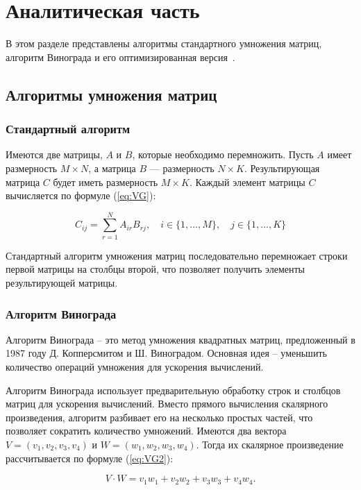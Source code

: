 \documentclass[a4paper, 12pt]{extreport}
\begin{document}
\chapter{Аналитическая часть}
В этом разделе представлены алгоритмы стандартного умножения матриц, алгоритм Винограда и его оптимизированная версия~\cite{bib1}.

\section{Алгоритмы умножения матриц}

\subsection{Стандартный алгоритм}

Имеются две матрицы, $A$ и $B$, которые необходимо перемножить. Пусть $A$ имеет размерность \( M \times N \), а матрица $B$ — размерность \( N \times K \). Результирующая матрица $C$ будет иметь размерность \( M \times K \). Каждый элемент матрицы $C$ вычисляется по формуле (\ref{eq:VG}):

\begin{equation}
        \label{eq:VG}
	C_{ij} = \sum_{r=1}^{N} A_{ir} B_{rj}, \quad i \in \{1, \dots, M\}, \quad j \in \{1, \dots, K\}
\end{equation}

Стандартный алгоритм умножения матриц последовательно перемножает строки первой матрицы на столбцы второй, что позволяет получить элементы результирующей матрицы.

\subsection{Алгоритм Винограда}

Алгоритм Винограда -- это метод умножения квадратных матриц, предложенный в 1987 году Д. Копперсмитом и Ш. Виноградом. Основная идея -- уменьшить количество операций умножения для ускорения вычислений. 

Алгоритм Винограда использует предварительную обработку строк и столбцов матриц для ускорения вычислений. Вместо прямого вычисления скалярного произведения, алгоритм разбивает его на несколько простых частей, что позволяет сократить количество умножений. Имеются два вектора $V = (v_1, v_2, v_3, v_4)$ и $W = (w_1, w_2, w_3, w_4)$. Тогда их скалярное произведение рассчитывается по формуле (\ref{eq:VG2}):

\begin{equation}
    \label{eq:VG2}
	V \cdot W = v_1w_1 + v_2w_2 + v_3w_3 + v_4w_4.
\end{equation}
\end{document}
